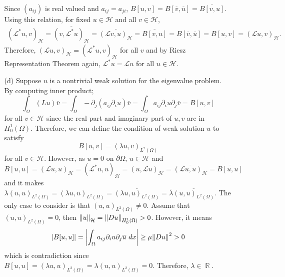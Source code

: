 \documentclass{article}
\DeclareMathOperator{\rr}{\mathbb{R}}
\begin{document}
\begin{enumerate}
\begin{enumerate}
Since $(a_{ij})$ is real valued and $a_{ij}=a_{ji}$, $B[u,v]=B[\overline{v},\overline{u}]=\overline{B[v,u]}$. Using this relation, for fixed $u\in\mathcal{H}$ and all $v\in \mathcal{H}$,
\begin{equation*}
\begin{split}
(\mathcal{L}^*u, v)_{\mathcal{H}}=\overline{(v,\mathcal{L}^*u)_{\mathcal{H}}}=\overline{(\mathcal{L}v,u)_{\mathcal{H}}}=\overline{B[v,u]}=B[\overline{v},\overline{u}] =B[u,v] =(\mathcal{L}u,v)_{\mathcal{H}}.
\end{split}
\end{equation*}
Therefore, $(\mathcal{L}u,v)_{\mathcal{H}}=(\mathcal{L}^*u,v)_{\mathcal{H}}$ for all $v$ and by Riesz Representation Theorem again, $\mathcal{L}^*u=\mathcal{L}u$ for all $u\in \mathcal{H}$.
\item[(d)] Suppose $u$ is a nontrivial weak solution for the eigenvalue problem. By computing inner product;
\begin{equation*}
\int_\Omega (Lu)\overline{v}=\int_\Omega -\partial_j(a_{ij}\partial_i u)\overline{v}=\int_\Omega a_{ij}\partial_i u\partial_j \overline{v}=B[u,v]
\end{equation*}
for all $v\in \mathcal{H}$ since the real part and imaginary part of $u,v$ are in $H^1_0(\Omega)$. Therefore, we can define the condition of weak solution $u$ to satisfy
\begin{equation*}
B[u,v]=(\lambda u,v)_{L^2(\Omega)}
\end{equation*}
for all $v\in\mathcal{H}$. However, as $u=0$ on $\partial \Omega$, $u\in \mathcal{H}$ and
\begin{equation*}
B[u,u]=(\mathcal{L}u,u)_{\mathcal{H}}=(\mathcal{L}^*u,u)_{\mathcal{H}}=(u,\mathcal{L}u)_{\mathcal{H}}=\overline{(\mathcal{L}u,u)_{\mathcal{H}}}=\overline{B[u,u]}
\end{equation*}
and it makes $\lambda(u,u)_{L^2(\Omega)}=(\lambda u,u)_{L^2(\Omega)}=\overline{(\lambda u,u)_{L^2(\Omega)}}=\overline{\lambda}\overline{(u,u)_{L^2(\Omega)}}$. The only case to consider is that $(u,u)_{L^2(\Omega)}\neq 0$. Assume that $(u,u)_{L^2(\Omega)}=0$, then $\norm{u}_{\mathcal{H}}=\norm{Du}_{H^1_0(\Omega)}>0$. However, it means
\begin{equation*}
\abs{B[u,u]}=\abs{\int_\Omega a_{ij}\partial_i u\partial_j \overline{u}~dx}\geq \mu \norm{Du}^2>0
\end{equation*}
which is contradiction since $B[u,u]=(\lambda u, u)_{L^2(\Omega)}=\lambda(u,u)_{L^2(\Omega)}=0$. Therefore, $\lambda\in \rr$.
\end{enumerate}
\end{enumerate}
\end{document}
